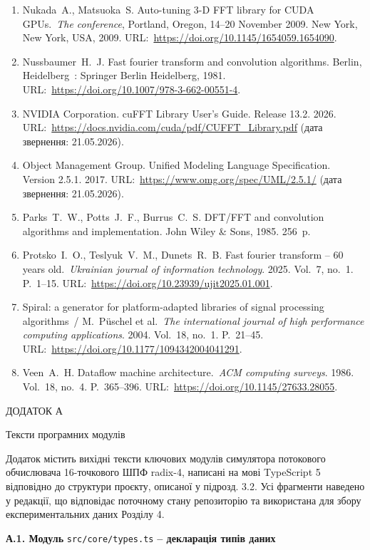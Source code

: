 \documentclass[
]{article}
\newcommand{\passthrough}[1]{#1}
\begin{document}
\begin{enumerate}
  1993. 80~p.
\item
  Nukada~A., Matsuoka~S. Auto-tuning 3-D FFT library for CUDA
  GPUs.~\emph{The conference}, Portland, Oregon, 14--20 November 2009.
  New York, New York, USA, 2009.
  URL:~\url{https://doi.org/10.1145/1654059.1654090}.
\item
  Nussbaumer~H.~J. Fast fourier transform and convolution algorithms.
  Berlin, Heidelberg~: Springer Berlin Heidelberg, 1981.
  URL:~\url{https://doi.org/10.1007/978-3-662-00551-4}.
\item
  NVIDIA Corporation. cuFFT Library User's Guide. Release 13.2. 2026.
  URL:~\url{https://docs.nvidia.com/cuda/pdf/CUFFT_Library.pdf} (дата
  звернення: 21.05.2026).
\item
  Object Management Group. Unified Modeling Language Specification.
  Version 2.5.1. 2017. URL:~\url{https://www.omg.org/spec/UML/2.5.1/}
  (дата звернення: 21.05.2026).
\item
  Parks~T.~W., Potts~J.~F., Burrus~C.~S. DFT/FFT and convolution
  algorithms and implementation. John Wiley \& Sons, 1985. 256~p.
\item
  Protsko~I.~O., Teslyuk~V.~M., Dunets~R.~B. Fast fourier transform --
  60 years old.~\emph{Ukrainian journal of information technology}.
  2025. Vol.~7, no.~1. P.~1--15.
  URL:~\url{https://doi.org/10.23939/ujit2025.01.001}.
\item
  Spiral: a generator for platform-adapted libraries of signal
  processing algorithms~/ M.~Püschel et al.~\emph{The international
  journal of high performance computing applications}. 2004. Vol.~18,
  no.~1. P.~21--45. URL:~\url{https://doi.org/10.1177/1094342004041291}.
\item
  Veen~A.~H. Dataflow machine architecture.~\emph{ACM computing
  surveys}. 1986. Vol.~18, no.~4. P.~365--396.
  URL:~\url{https://doi.org/10.1145/27633.28055}.
\end{enumerate}

\protect{}\label{_Toc230737411}{}ДОДАТОК А

Тексти програмних модулів

Додаток містить вихідні тексти ключових модулів симулятора потокового
обчислювача 16-точкового ШПФ radix-4, написані на мові TypeScript 5
відповідно до структури проєкту, описаної у підрозд. 3.2. Усі фрагменти
наведено у редакції, що відповідає поточному стану репозиторію та
використана для збору експериментальних даних Розділу 4.

\textbf{А.1. Модуль}
\passthrough{\lstinline!src!}\passthrough{\lstinline!/!}\passthrough{\lstinline!core!}\passthrough{\lstinline!/!}\passthrough{\lstinline!types!}\passthrough{\lstinline!.!}\passthrough{\lstinline!ts!}
\textbf{-- декларація типів даних}
\end{document}
